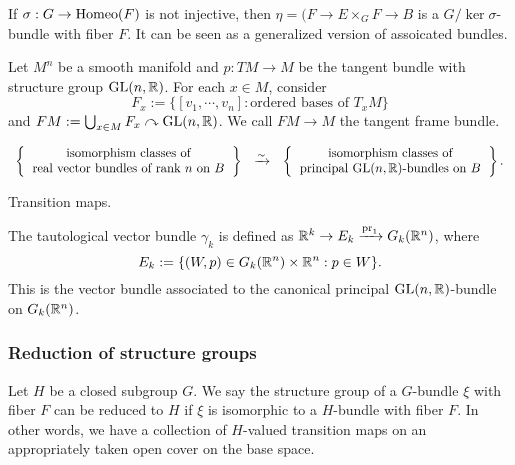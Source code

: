\documentclass{../../small}
\begin{document}
\begin{rmk*}
If $\sigma:G\to\operatorname{Homeo}(F)$ is not injective, then $\eta=(F\to E\times_GF\to B$ is a $G/\ker\sigma$-bundle with fiber $F$.
It can be seen as a generalized version of assoicated bundles.
\end{rmk*}
\begin{ex*}
Let $M^n$ be a smooth manifold and $p:TM\to M$ be the tangent bundle with structure group $\mathrm{GL}(n,\mathbb{R})$.
For each $x\in M$, consider
\[F_x:=\{[v_1,\cdots,v_n]:\text{ordered bases of }T_xM\}\]
and $FM:=\bigcup_{x\in M}F_x\curvearrowright\mathrm{GL}(n,\mathbb{R})$.
We call $FM\to M$ the tangent frame bundle.
\end{ex*}

\begin{thm*}[2.14]
\[\begin{array}{ccc}
\left\{\begin{tabular}{c}isomorphism classes of\\real vector bundles of rank $n$ on $B$\end{tabular}\right\}
&\xrightarrow{\sim}&
\left\{\begin{tabular}{c}isomorphism classes of\\principal $\GL(n,\R)$-bundles on $B$\end{tabular}\right\}.
\end{array}\]
\end{thm*}
\begin{pf}
Transition maps.
\end{pf}

\begin{ex*}
The tautological vector bundle $\gamma_k$ is defined as $\mathbb{R}^k\to E_k\xrightarrow{\operatorname{pr}_1}G_k(\mathbb{R}^n)$, where
\[E_k:=\{(W,p)\in G_k(\mathbb{R}^n)\times\mathbb{R}^n:p\in W\}.\]
This is the vector bundle associated to the canonical principal $\mathrm{GL}(n,\mathbb{R})$-bundle on $G_k(\mathbb{R}^n)$.
\end{ex*}

\subsubsection*{Reduction of structure groups}
\begin{defn*}[2.15]
Let $H$ be a closed subgroup $G$.
We say the structure group of a $G$-bundle $\xi$ with fiber $F$ can be reduced to $H$ if $\xi$ is isomorphic to a $H$-bundle with fiber $F$.
In other words, we have a collection of $H$-valued transition maps on an appropriately taken open cover on the base space.
\end{defn*}
\end{document}
